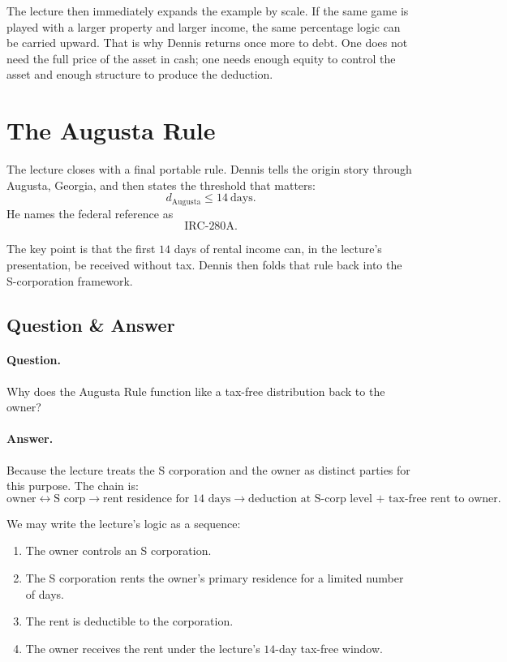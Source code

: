 The lecture then immediately expands the example by scale. If the same game is played with a larger property and larger income, the same percentage logic can be carried upward. That is why Dennis returns once more to debt. One does not need the full price of the asset in cash; one needs enough equity to control the asset and enough structure to produce the deduction.

\section{The Augusta Rule}

The lecture closes with a final portable rule. Dennis tells the origin story through Augusta, Georgia, and then states the threshold that matters:
\begin{equation}
d_{\mathrm{Augusta}} \le 14\ \text{days}.
\end{equation}
He names the federal reference as
\begin{equation}
\mathrm{IRC}\text{-}280\mathrm{A}.
\end{equation}

The key point is that the first \(14\) days of rental income can, in the lecture's presentation, be received without tax. Dennis then folds that rule back into the S-corporation framework.

\subsection{Question \& Answer}

\paragraph{Question.} Why does the Augusta Rule function like a tax-free distribution back to the owner?

\paragraph{Answer.} Because the lecture treats the S corporation and the owner as distinct parties for this purpose. The chain is:
\begin{equation}
\text{owner} \leftrightarrow \text{S corp}
\to
\text{rent residence for }14\text{ days}
\to
\text{deduction at S-corp level + tax-free rent to owner}.
\end{equation}

We may write the lecture's logic as a sequence:
\begin{enumerate}
\item The owner controls an S corporation.
\item The S corporation rents the owner's primary residence for a limited number of days.
\item The rent is deductible to the corporation.
\item The owner receives the rent under the lecture's \(14\)-day tax-free window.
\end{enumerate}

